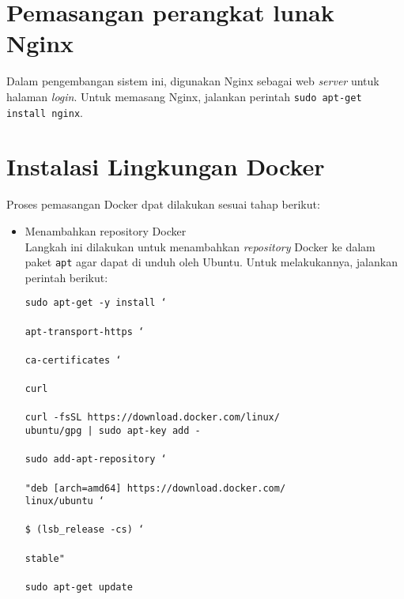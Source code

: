 \section*{Pemasangan perangkat lunak Nginx}
Dalam pengembangan sistem ini, digunakan Nginx sebagai web \textit{server} untuk halaman \textit{login}. Untuk memasang Nginx, jalankan perintah \texttt{sudo apt-get install nginx}.

\section*{Instalasi Lingkungan Docker}
Proses pemasangan Docker dpat dilakukan sesuai tahap berikut:
\begin{itemize}
	\item Menambahkan repository Docker\\
	Langkah ini dilakukan untuk menambahkan \textit{repository} Docker ke dalam paket \texttt{apt} agar dapat di unduh oleh Ubuntu. Untuk melakukannya, jalankan perintah berikut:
	\begin{tabbing}
		\texttt{sudo apt-get -y install \char`\\} \\
		\hspace{5 mm} \texttt{apt-transport-https \char`\\} \\
		\hspace{5 mm} \texttt{ca-certificates \char`\\} \\
		\hspace{5 mm} \texttt{curl} \\
		\\
		\texttt{curl -fsSL https://download.docker.com/linux/} \\
		\hspace{7 mm} \texttt{ubuntu/gpg | sudo apt-key add -} \\
		\\
		\texttt{sudo add-apt-repository \char`\\} \\
		\hspace{7 mm} \texttt{"deb [arch=amd64] https://download.docker.com/} \\
		\hspace{9 mm} \texttt{linux/ubuntu \char`\\} \\
		\hspace{7 mm} \texttt{\$ (lsb\_release -cs) \char`\\} \\
		\hspace{7 mm} \texttt{stable"} \\
		\\
		\texttt{sudo apt-get update} \\
	\end{tabbing}
	

\end{itemize}
